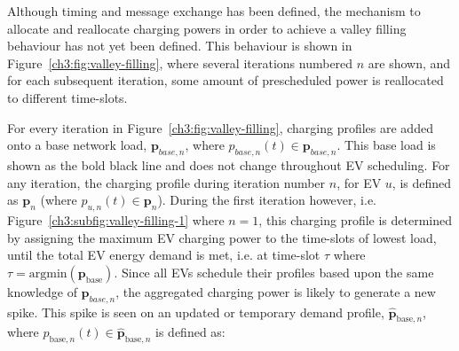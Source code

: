 Although timing and message exchange has been defined, the mechanism to allocate and reallocate charging powers in order to achieve a valley filling behaviour has not yet been defined.
This behaviour is shown in Figure~\ref{ch3:fig:valley-filling}, where several iterations numbered $n$ are shown, and for each subsequent iteration, some amount of prescheduled power is reallocated to different time-slots.




For every iteration in Figure~\ref{ch3:fig:valley-filling}, charging profiles are added onto a base network load, $\textbf{p}_{base,n}$, where $p_{base,n}(t) \in \textbf{p}_{base,n}$.
This base load is shown as the bold black line and does not change throughout EV scheduling.
For any iteration, the charging profile during iteration number $n$, for EV $u$, is defined as $\textbf{p}_n$ (where $p_{u,n}(t) \in \textbf{p}_n$).
During the first iteration however, i.e. Figure~\ref{ch3:subfig:valley-filling-1} where $n=1$, this charging profile is determined by assigning the maximum EV charging power to the time-slots of lowest load, until the total EV energy demand is met, i.e. at time-slot $\tau$ where $\tau = \text{argmin}(\textbf{p}_\text{base})$.
Since all EVs schedule their profiles based upon the same knowledge of $\textbf{p}_{base,n}$, the aggregated charging power is likely to generate a new spike.
This spike is seen on an updated or temporary demand profile, $\hat{\textbf{p}}_{\text{base}, n}$, where $\hat{p}_{\text{base}, n}(t) \in \hat{\textbf{p}}_{\text{base}, n}$ is defined as:




